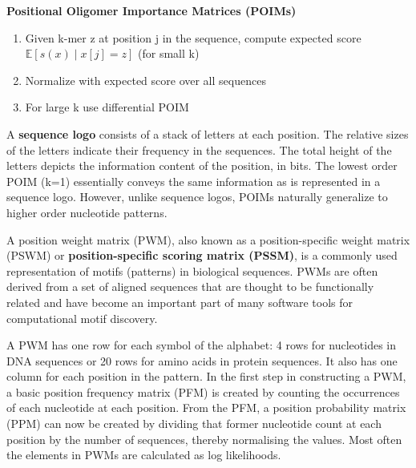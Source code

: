\documentclass[11pt]{article}
\newcommand{\ulb}{\begin{enumerate}[label=\textbullet,topsep=0pt,itemsep=-0.5ex,partopsep=1ex,parsep=1ex]}
\newcommand{\ule}{\end{enumerate}\vspace{1mm}}
\newcommand{\given}{\mid}
\begin{document}
\par \textbf{Positional Oligomer Importance Matrices (POIMs)}
\ulb\item Given k-mer z at position j in the sequence, compute expected score $\mathbb{E} [ s(x)  \given  x[j] = z ]$ (for small k)
\item Normalize with expected score over all sequences
\item For large k use differential POIM
\ule
A \textbf{sequence logo} consists of a stack of letters at each position. The relative sizes of the letters indicate their frequency in the sequences. The total height of the letters depicts the information content of the position, in bits. The lowest order POIM (k=1) essentially conveys the same information as is represented in a sequence logo. However, unlike sequence logos, POIMs naturally generalize to higher order nucleotide patterns.
\par A position weight matrix (PWM), also known as a position-specific weight matrix (PSWM) or \textbf{position-specific scoring matrix (PSSM)}, is a commonly used representation of motifs (patterns) in biological sequences. PWMs are often derived from a set of aligned sequences that are thought to be functionally related and have become an important part of many software tools for computational motif discovery.
\par A PWM has one row for each symbol of the alphabet: 4 rows for nucleotides in DNA sequences or 20 rows for amino acids in protein sequences. It also has one column for each position in the pattern. In the first step in constructing a PWM, a basic position frequency matrix (PFM) is created by counting the occurrences of each nucleotide at each position. From the PFM, a position probability matrix (PPM) can now be created by dividing that former nucleotide count at each position by the number of sequences, thereby normalising the values. Most often the elements in PWMs are calculated as log likelihoods. 
\end{document}
